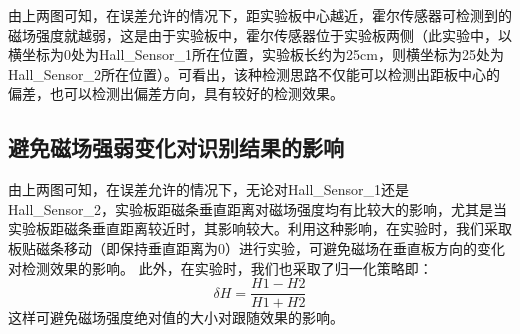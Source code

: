 \begin{figure}[htbp]
\centering

%
%

\centering
\label{fig:2.2}
\end{figure}

\par{由上两图可知，在误差允许的情况下，距实验板中心越近，霍尔传感器可检测到的磁场强度就越弱，这是由于实验板中，霍尔传感器位于实验板两侧（此实验中，以横坐标为0处为Hall\_Sensor\_1所在位置，实验板长约为25cm，则横坐标为25处为Hall\_Sensor\_2所在位置）。可看出，该种检测思路不仅能可以检测出距板中心的偏差，也可以检测出偏差方向，具有较好的检测效果。}

\subsection{避免磁场强弱变化对识别结果的影响}
\par{由上两图可知，在误差允许的情况下，无论对Hall\_Sensor\_1还是Hall\_Sensor\_2，实验板距磁条垂直距离对磁场强度均有比较大的影响，尤其是当实验板距磁条垂直距离较近时，其影响较大。利用这种影响，在实验时，我们采取板贴磁条移动（即保持垂直距离为0）进行实验，可避免磁场在垂直板方向的变化对检测效果的影响。
此外，在实验时，我们也采取了归一化策略即：$$ \delta H = \frac{H1-H2}{H1+H2} $$这样可避免磁场强度绝对值的大小对跟随效果的影响。}
